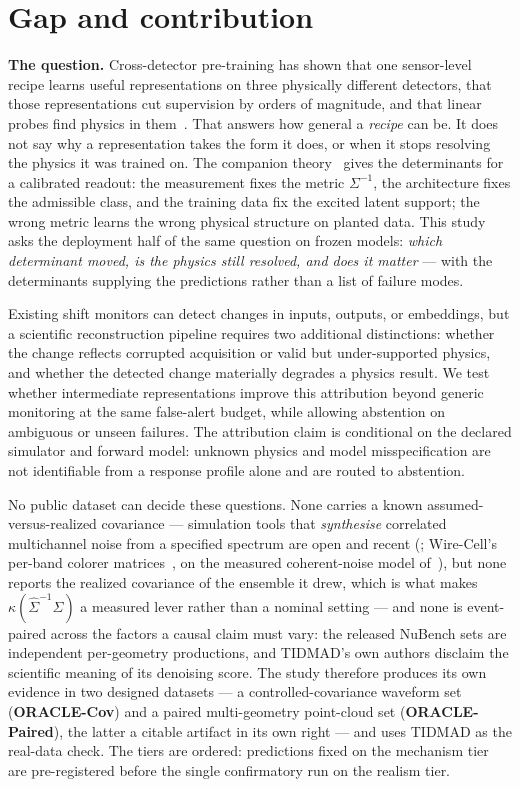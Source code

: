 \documentclass[10pt,twocolumn]{extarticle}
\begin{document}
\section{Gap and contribution}

\textbf{The question.} Cross-detector pre-training has shown that one
sensor-level recipe learns useful representations on three physically
different detectors, that those representations cut supervision by orders of
magnitude, and that linear probes find physics in them~\cite{panda2}. That
answers how general a \emph{recipe} can be. It does not say why a
representation takes the form it does, or when it stops resolving the physics
it was trained on. The companion theory~\cite{paper1} gives the determinants
for a calibrated readout: the measurement fixes the metric $\Sigma^{-1}$, the
architecture fixes the admissible class, and the training data fix the
excited latent support; the wrong metric learns the wrong physical structure
on planted data. This study asks the deployment half of the same question on
frozen models: \emph{which determinant moved, is the physics still resolved,
and does it matter} --- with the determinants supplying the predictions rather
than a list of failure modes.

Existing shift monitors can detect changes in inputs, outputs, or embeddings,
but a scientific reconstruction pipeline requires two additional distinctions:
whether the change reflects corrupted acquisition or valid but under-supported
physics, and whether the detected change materially degrades a physics result.
We test whether intermediate representations improve this attribution beyond
generic monitoring at the same false-alert budget, while allowing abstention on
ambiguous or unseen failures. The attribution claim is conditional on the
declared simulator and forward model: unknown physics and model
misspecification are not identifiable from a response profile alone and are
routed to abstention.

No public dataset can decide these questions. None carries a known
assumed-versus-realized covariance --- simulation tools that \emph{synthesise}
correlated multichannel noise from a specified spectrum are open and recent
(\cite{pytessim}; Wire-Cell's per-band colorer
matrices~\cite{wirecell}, on the measured coherent-noise model
of~\cite{microboone2017noise}), but none reports the realized covariance of the
ensemble it drew, which is what makes $\kappa(\hat\Sigma^{-1}\Sigma)$ a measured
lever rather than a nominal setting --- and none is event-paired across the factors
a causal claim must vary: the released NuBench sets are independent
per-geometry productions, and TIDMAD's own authors disclaim the scientific
meaning of its denoising score. The study therefore produces its own evidence
in two designed datasets --- a controlled-covariance waveform set
(\textbf{ORACLE-Cov}) and a paired multi-geometry point-cloud set
(\textbf{ORACLE-Paired}), the latter a citable artifact in its own right ---
and uses TIDMAD as the real-data check. The tiers are ordered: predictions
fixed on the mechanism tier are pre-registered before the single confirmatory
run on the realism tier.
\end{document}
